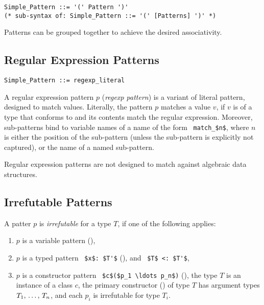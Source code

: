 \syntax\begin{lstlisting}
Simple_Pattern ::= '(' Pattern ')'
(* sub-syntax of: Simple_Pattern ::= '(' [Patterns] ')' *)
\end{lstlisting}

Patterns can be grouped together to achieve the desired associativity. 






\subsection{Regular Expression Patterns}
\label{sec:regexp-patterns}

\syntax\begin{lstlisting}
Simple_Pattern ::= regexp_literal
\end{lstlisting}

A regular expression pattern $p$ ({\em regexp pattern}) is a variant of literal pattern, designed to match  values. Literally, the pattern $p $ matches a value $v$, if $v$ is of a type that conforms to  and its contents match the regular expression. Moreover, sub-patterns bind to variable names of a name of the form ~\lstinline!match_$n$!, where $n$ is either the position of the sub-pattern (unless the sub-pattern is explicitly not captured), or the name of a named sub-pattern. 

Regular expression patterns are not designed to match against algebraic data structures. 

\subsection{Irrefutable Patterns}
\label{sec:irrefutable-patterns}

A patter $p$ is {\em irrefutable} for a type $T$, if one of the following applies: 
\begin{enumerate}
\item $p$ is a variable pattern (),
\item $p$ is a typed pattern ~\lstinline!$x$: $T'$! (), and ~\lstinline!$T$ <: $T'$!,
\item $p$ is a constructor pattern ~\lstinline!$c$($p_1 \ldots p_n$)! (), the type $T$ is an instance of a class $c$, the primary constructor () of type $T$ has argument types $T_1 ,\, \ldots ,\, T_n$, and each $p_i$ is irrefutable for type $T_i$. 
\end{enumerate}






